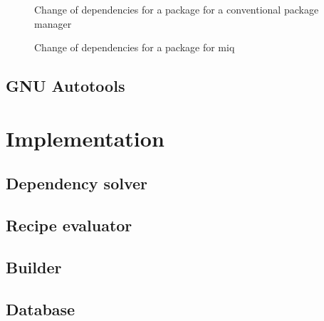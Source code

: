 \begin{figure}[hbtp]
    \centerfloat
    
    \caption{Change of dependencies for a package for a conventional package manager}
    \label{fig:depswap}
\end{figure}

\begin{figure}[hbtp]
    \centerfloat
    
    \caption{Change of dependencies for a package for miq}
    \label{fig:depswap_miq}
\end{figure}






\section{GNU Autotools}

\FloatBarrier
\chapter{Implementation}

\section{Dependency solver}

\section{Recipe evaluator}

\section{Builder}


\section{Database}


